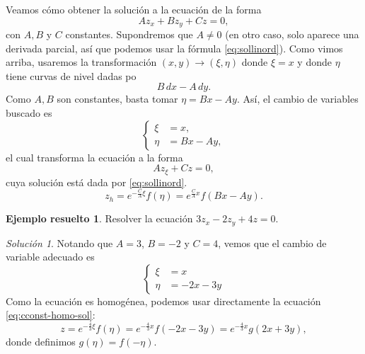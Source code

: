 \documentclass[11pt,letterpaper,draft]{report}
\theoremstyle{plain}
\theoremstyle{definition}
\newtheorem{solved}[theorem]{Ejemplo resuelto}
\theoremstyle{remark}
\newtheorem*{solution}{Solución}
\newcommand\<{\langle}
\renewcommand\>{\rangle}
\begin{document}
Veamos cómo obtener la solución a la ecuación de la forma
\begin{equation}
  \label{eq:cconst-homo}
  A z_x + B z_y + C z = 0,
\end{equation}
con $A, B$ y $C$ constantes.
Supondremos que \(A\neq 0\) (en otro caso, solo aparece una derivada
parcial, así que podemos usar la fórmula \eqref{eq:sollinord}).
Como vimos arriba, usaremos la transformación \((x,y)\to(\xi,\eta)\)
donde \(\xi=x\) y donde \(\eta\) tiene curvas de nivel dadas po
\begin{equation}
  \label{eq:cond-eta-cconst}
  B\,dx - A\,dy 
.\end{equation}
Como \(A,B\) son constantes, basta tomar \(\eta = Bx-Ay\).
Así, el cambio de variables buscado es
\begin{equation}
  \label{eq:cambio-lin-cconst}
  \left\{
    \begin{aligned}
      \xi &= x,
      \\
      \eta &= Bx - Ay,
    \end{aligned}
  \right.
\end{equation}
el cual transforma la ecuación a la forma
\begin{equation}
  \label{eq:cconst-homo-trans}
  Az_\xi + Cz = 0
,\end{equation}
cuya solución está dada por \eqref{eq:sollinord}.
\begin{equation}
  \label{eq:cconst-homo-sol} 
  z_h = e^{-\frac{C}{A}\xi} f(\eta) = e^{\frac{C}{A}x}f(Bx-Ay).
\end{equation}

\begin{solved}
  Resolver la ecuación $3 z_x - 2 z_y + 4z = 0$.
  \begin{solution}
    Notando que $A = 3$, $B = -2$ y $C = 4$,
    vemos que el cambio de variable adecuado es
    \begin{equation}
      \left\{
        \begin{aligned}
          \xi &= x
          \\
          \eta &= -2x-3y
        \end{aligned}
      \right.
    \end{equation}
    Como la ecuación es homogénea, podemos usar directamente la
    ecuación \eqref{eq:cconst-homo-sol}:
    \[
      z = e^{-\frac{4}{3} \xi} f(\eta)
      =  e^{-\frac{4}{3} x} f(-2x - 3y)
      =  e^{-\frac{4}{3} x} g(2x + 3y),
    \] 
    donde definimos \(g(\eta)=f(-\eta)\).
  \end{solution}
\end{solved}
\end{document}
